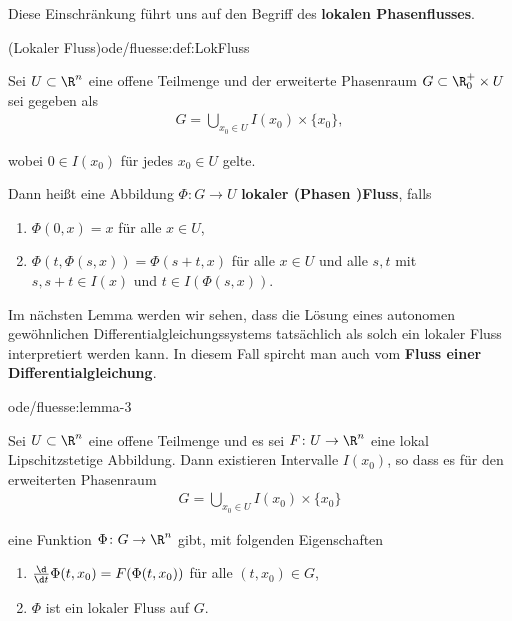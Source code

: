 \documentclass[letterpaper,10pt,english]{jupyterBook}
\begin{document}
\par
Diese Einschränkung führt uns auf den Begriff des \textbf{lokalen Phasenflusses}.
\begin{definition}{(Lokaler Fluss)}{ode/fluesse:def:LokFluss}



\par
Sei \(U \subset \R^n\) eine offene Teilmenge und der erweiterte Phasenraum \(G\subset \R^+_0\times U\) sei gegeben als
\begin{align*}
G = \bigcup_{x_0\in U} I(x_0) \times \{x_0\},
\end{align*}
\par
wobei \(0\in I(x_0)\) für jedes \(x_0\in U\) gelte.

\par
Dann heißt eine Abbildung \(\Phi: G\rightarrow U\) \textbf{lokaler (Phasen )Fluss}, falls
\begin{enumerate}

\item {} 
\par
\(\Phi(0,x) = x\) für alle \(x\in U\),

\item {} 
\par
\(\Phi(t, \Phi(s, x)) = \Phi(s+t, x)\) für alle \(x\in U\) und alle \(s,t\) mit \(s, s+t\in I(x)\) und \(t\in I(\Phi(s,x))\).

\end{enumerate}
\end{definition}

\par
Im nächsten Lemma werden wir sehen, dass die Lösung eines autonomen gewöhnlichen Differentialgleichungssystems tatsächlich als solch ein lokaler Fluss interpretiert werden kann.
In diesem Fall spircht man auch vom \textbf{Fluss einer Differentialgleichung}.
\begin{lemma}{}{ode/fluesse:lemma-3}



\par
Sei \(U\subset\R^n\) eine offene Teilmenge und es sei \(F \colon U \rightarrow \R^n\) eine lokal Lipschitzstetige Abbildung.
Dann existieren Intervalle \(I(x_0)\), so dass es für den erweiterten Phasenraum
\begin{align*}
G = \bigcup_{x_0\in U} I(x_0)\times\{x_0\}
\end{align*}
\par
eine Funktion \(\Phi \colon G\rightarrow \R^n\) gibt, mit folgenden Eigenschaften
\begin{enumerate}

\item {} 
\par
\(\frac{\d}{\d t} \Phi(t, x_0) = F(\Phi(t, x_0))\) für alle \((t,x_0)\in G\),

\item {} 
\par
\(\Phi\) ist ein lokaler Fluss auf \(G\).

\end{enumerate}
\end{lemma}
\end{document}
